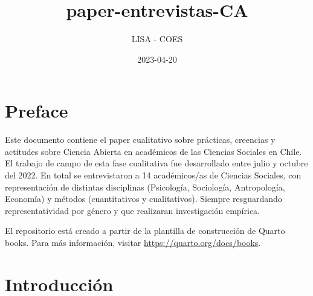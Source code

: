 \documentclass[
  letterpaper,
  DIV=11,
  numbers=noendperiod]{scrreprt}
\title{paper-entrevistas-CA}
\author{LISA - COES}
\date{2023-04-20}
\renewcommand*\contentsname{Table of contents}
\newcommand\contentsname{Table of contents}
\begin{document}
\maketitle

\renewcommand*\contentsname{Table of contents}
{
\hypersetup{linkcolor=}
\setcounter{tocdepth}{2}
\tableofcontents
}


\chapter*{Preface}\label{preface}


Este documento contiene el paper cualitativo sobre prácticas, creencias
y actitudes sobre Ciencia Abierta en académicos de las Ciencias Sociales
en Chile. El trabajo de campo de esta fase cualitativa fue desarrollado
entre julio y octubre del 2022. En total se entrevistaron a 14
académicos/as de Ciencias Sociales, con representación de distintas
disciplinas (Psicología, Sociología, Antropología, Economía) y métodos
(cuantitativos y cualitativos). Siempre resguardando representatividad
por género y que realizaran investigación empírica.

El repositorio está creado a partir de la plantilla de construcción de
Quarto books. Para más información, visitar
\url{https://quarto.org/docs/books}.


\chapter{Introducción}\label{introducciuxf3n}
\end{document}
